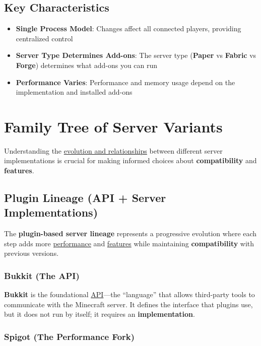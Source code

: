 \documentclass{article}
\begin{document}
\subsection{Key Characteristics}

\begin{itemize}
    \item \textbf{Single Process Model}: Changes affect all connected players, providing centralized control
    \item \textbf{Server Type Determines Add-ons}: The server type (\textbf{Paper} vs \textbf{Fabric} vs \textbf{Forge}) determines what add-ons you can run
    \item \textbf{Performance Varies}: Performance and memory usage depend on the implementation and installed add-ons
\end{itemize}

\newpage
\section{Family Tree of Server Variants}

Understanding the \uline{evolution and relationships} between different server implementations is crucial for making informed choices about \textbf{compatibility} and \textbf{features}.

\subsection{Plugin Lineage (API + Server Implementations)}

The \textbf{plugin-based server lineage} represents a progressive evolution where each step adds more \uline{performance} and \uline{features} while maintaining \textbf{compatibility} with previous versions.

\subsubsection{Bukkit (The API)}

\textbf{Bukkit} is the foundational \uline{API}---the ``language'' that allows third-party tools to communicate with the Minecraft server. It defines the interface that plugins use, but it does not run by itself; it requires an \textbf{implementation}.

\subsubsection{Spigot (The Performance Fork)}
\end{document}
